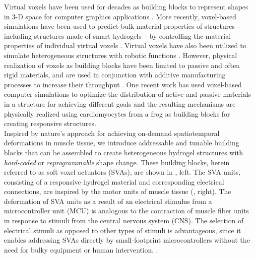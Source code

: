 Virtual voxels have been used for decades as building blocks to represent shapes in 3-D space for computer graphics applications .
More recently, voxel-based simulations have been used to predict bulk material properties of structures -- including structures made of smart hydrogels -- by controlling the material properties of individual virtual voxels . Virtual voxels have also been utilized to simulate heterogeneous structures with robotic functions . 
However, physical realization of voxels as building blocks have been limited to passive and often rigid materials, and are used in conjunction with additive manufacturing processes to increase their throughput . One recent work has used voxel-based computer simulations to optimize the distribution of active and passive materials in a structure for achieving different goals and the resulting mechanisms are physically realized using cardiomyocytes from a frog as building blocks for creating responsive structures.\\

Inspired by nature's approach for achieving on-demand spatiotemporal deformations in muscle tissue, we introduce addressable and tunable building blocks that can be assembled to create heterogeneous hydrogel structures with \textit{hard-coded} or \textit{reprogrammable} shape change. These building blocks, herein referred to as soft voxel actuators (SVAs), are shown in , left. The SVA units, consisting of a responsive hydrogel material and corresponding electrical connections, are inspired by the motor units of muscle tissue (, right).
The deformation of SVA units as a result of an electrical stimulus from a microcontroller unit (MCU) is analogous to the contraction of muscle fiber units in response to stimuli from the central nervous system (CNS).
The selection of electrical stimuli as opposed to other types of stimuli is advantageous, since it enables addressing SVAs directly by small-footprint microcontrollers without the need for bulky equipment or human intervention. .\\

